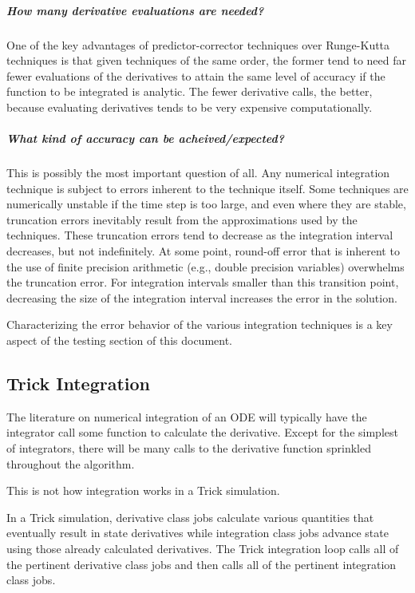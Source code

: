 \subparagraph{How many derivative evaluations are needed?}
\leavevmode\newline
One of the key advantages of predictor-corrector techniques over Runge-Kutta
techniques is that given techniques of the same order, the former tend to need
far fewer evaluations of the derivatives to attain the same level of accuracy
if the function to be integrated is analytic. The fewer derivative calls, the
better, because evaluating derivatives tends to be very expensive
computationally.

\subparagraph{What kind of accuracy can be acheived/expected?}
\leavevmode\newline
This is possibly the most important question of all.
Any numerical integration technique is subject to errors inherent to the
technique itself.
Some techniques are numerically unstable if the time step is too large,
and even where they are stable, truncation errors inevitably result from the
approximations used by the techniques. These truncation errors tend to
decrease as the integration interval decreases, but not indefinitely. At
some point, round-off error that is inherent to the use of finite precision
arithmetic (e.g., double precision variables) overwhelms the truncation error.
For integration intervals smaller than this transition point, decreasing the
size of the integration interval increases the error in the solution.

Characterizing the error behavior of the various integration techniques is
a key aspect of the testing section of this document.

\subsection{Trick Integration} \label{sec:con_des_trick}

The literature on numerical integration of an ODE will typically have the
integrator call some function to calculate the derivative.
Except for the simplest of integrators, there will be
many calls to the derivative function sprinkled throughout the algorithm.

This is not how integration works in a Trick simulation.

In a Trick simulation, derivative class jobs calculate various quantities
that eventually result in state derivatives while integration class jobs
advance state using those already calculated derivatives.
The Trick integration loop calls all of the pertinent derivative class jobs
and then calls all of the pertinent integration class jobs.

